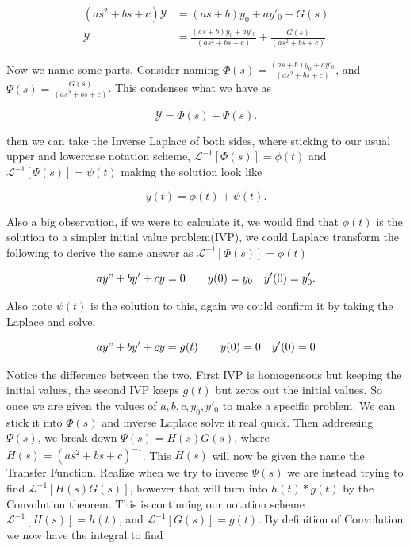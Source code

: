 \documentclass[12pt]{article}
\newcommand{\lp}{\mathscr{L}}
\newcommand{\hugey}{\mathscr{Y}}
\begin{document}
\begin{align*}
    (as^2+bs+c)\hugey &= (as+b)y_0+ay'_0+G(s) \\
    \hugey &= \frac{(as+b)y_0+ay'_0}{(as^2+bs+c)}+\frac{G(s)}{(as^2+bs+c)}.
\end{align*}

Now we name some parts. Consider naming $\Phi(s)=\frac{(as+b)y_0+ay'_0}{(as^2+bs+c)}$, and $\Psi(s)=\frac{G(s)}{(as^2+bs+c)}$. This condenses what we have as

\begin{equation*}
    \hugey = \Phi(s)+\Psi(s).
\end{equation*}

then we can take the Inverse Laplace of both sides, where sticking to our usual upper and lowercase notation scheme, $\lp^{-1}[\Phi(s)]=\phi(t)$ and $\lp^{-1}[\Psi(s)]=\psi(t)$ making the solution look like

\begin{equation*}
    y(t) = \phi(t)+\psi(t).
\end{equation*}

Also a big observation, if we were to calculate it, we would find that $\phi(t)$ is the solution to a simpler initial value problem(IVP), we could Laplace transform the following to derive the same answer as $\lp^{-1}[\Phi(s)]=\phi(t)$

\begin{equation*}
    ay"+by'+cy=0 \qquad y(0)=y_0 \quad y'(0)=y'_0.
\end{equation*}

Also note $\psi(t)$ is the solution to this, again we could confirm it by taking the Laplace and solve. 

\begin{equation*}
    ay"+by'+cy=g(t) \qquad y(0)=0 \quad y'(0)=0
\end{equation*}

Notice the difference between the two. First IVP is homogeneous but keeping the initial values, the second IVP keeps $g(t)$ but zeros out the initial values. So once we are given the values of $a,b,c,y_0,y'_0$ to make a specific problem. We can stick it into $\Phi(s)$ and inverse Laplace solve it real quick. Then addressing $\Psi(s)$, we break down $\Psi(s)=H(s)G(s)$, where $H(s)=(as^2+bs+c)^{-1}$. This $H(s)$ will now be given the name the Transfer Function. Realize when we try to inverse $\Psi(s)$ we are instead trying to find $\lp^{-1}[H(s)G(s)]$, however that will turn into $h(t)\ast g(t)$ by the Convolution theorem. This is continuing our notation scheme $\lp^{-1}[H(s)]=h(t)$, and $\lp^{-1}[G(s)]=g(t)$. By definition of Convolution we now have the integral to find
\end{document}
